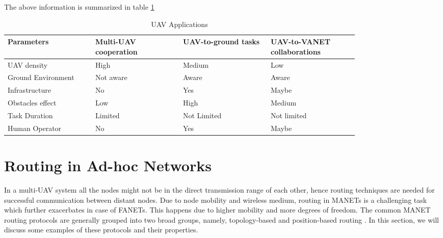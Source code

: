 The above information is summarized in table \ref{tab:uav_applications}

\begin{table}
\caption{UAV Applications}
\label{tab:uav_applications}
\begin{tabular}{|p{0.2\linewidth}|p{0.2\linewidth}|p{0.2\linewidth}|p{0.2\linewidth}|}
\toprule
Parameters & Multi-UAV cooperation & UAV-to-ground tasks & UAV-to-VANET collaborations\\
\midrule
UAV density & High & Medium & Low\\
\midrule
Ground Environment 	& Not aware &  Aware & Aware  \\
\midrule
Infrastructure & No & Yes &  Maybe \\
\midrule
Obstacles effect & Low & High & Medium \\
\midrule
Task Duration & Limited & Not Limited & Not limited \\
\midrule
Human Operator & No & Yes & Maybe \\
\bottomrule
\end{tabular}
\end{table}

\section{Routing in Ad-hoc Networks}

In a multi-UAV system all the nodes might not be in the direct transmission range of each other, hence routing techniques are needed for successful communication between distant nodes. Due to node mobility and wireless medium, routing in MANETs is a challenging task which further exacerbates in case of FANETs. This happens due to higher mobility and more degrees of freedom. 
The common MANET routing protocols are generally grouped into two broad groups, namely, topology-based and position-based routing \cite{6238283}. In this section, we will discuss some examples of these protocols and their properties.

